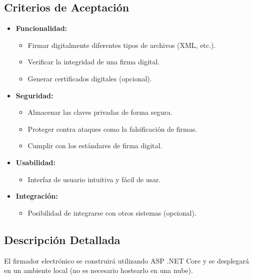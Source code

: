 \documentclass[
]{agujournal2019}
\providecommand{\tightlist}{%
  \setlength{\itemsep}{0pt}\setlength{\parskip}{0pt}}\usepackage{longtable,booktabs,array}
\begin{document}
\subsection{Criterios de Aceptación}\label{criterios-de-aceptaciuxf3n}

\begin{itemize}
\tightlist
\item
  \textbf{Funcionalidad:}

  \begin{itemize}
  \tightlist
  \item
    Firmar digitalmente diferentes tipos de archivos (XML, etc.).
  \item
    Verificar la integridad de una firma digital.
  \item
    Generar certificados digitales (opcional).
  \end{itemize}
\item
  \textbf{Seguridad:}

  \begin{itemize}
  \tightlist
  \item
    Almacenar las claves privadas de forma segura.
  \item
    Proteger contra ataques como la falsificación de firmas.
  \item
    Cumplir con los estándares de firma digital.
  \end{itemize}
\item
  \textbf{Usabilidad:}

  \begin{itemize}
  \tightlist
  \item
    Interfaz de usuario intuitiva y fácil de usar.
  \end{itemize}
\item
  \textbf{Integración:}

  \begin{itemize}
  \tightlist
  \item
    Posibilidad de integrarse con otros sistemas (opcional).
  \end{itemize}
\end{itemize}

\subsection{Descripción Detallada}\label{descripciuxf3n-detallada}

El firmador electrónico se construirá utilizando ASP .NET Core y se
desplegará en un ambiente local (no es necesario hostearlo en una nube).
\end{document}
